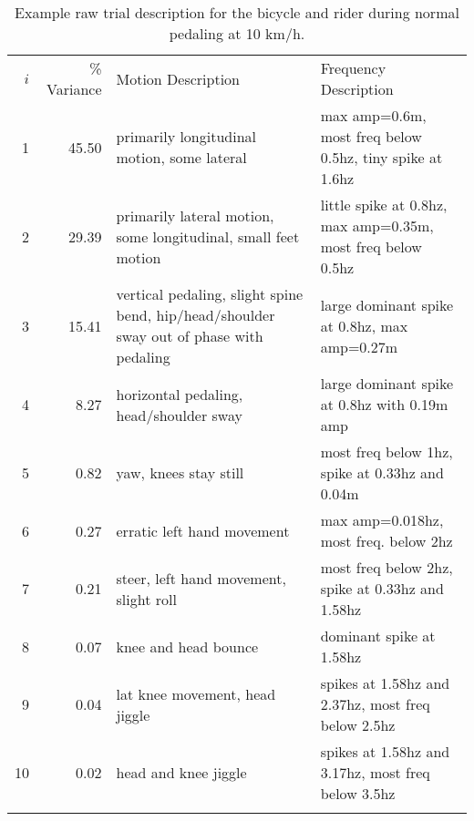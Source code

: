 \begin{table}
    \caption{Example raw trial description for the bicycle and rider during normal pedaling at 10 km/h.}
    \label{tab:trialDesc}
    \centering
    {\small
	\begin{tabular}{rrp{40mm}p{40mm}}
	\hline\noalign{\smallskip}
        $i$ & \% Variance & Motion Description & Frequency Description\\
        \noalign{\smallskip}\hline\noalign{\smallskip}
        1  & 45.50 & primarily longitudinal motion, some lateral & max amp=0.6m, most freq below 0.5hz, tiny spike at 1.6hz\\
        2  & 29.39 & primarily lateral motion, some longitudinal, small feet motion & little spike at 0.8hz, max amp=0.35m, most freq below 0.5hz\\
        3  & 15.41 & vertical pedaling, slight spine bend, hip/head/shoulder sway out of phase with pedaling & large dominant spike at 0.8hz, max amp=0.27m\\
        4  & 8.27  & horizontal pedaling, head/shoulder sway & large dominant spike at 0.8hz with 0.19m amp\\
        5  & 0.82  & yaw, knees stay still & most freq below 1hz, spike at 0.33hz and 0.04m\\
        6  & 0.27  & erratic left hand movement & max amp=0.018hz, most freq. below 2hz\\
        7  & 0.21  & steer, left hand movement, slight roll & most freq below 2hz, spike at 0.33hz and 1.58hz\\
        8  & 0.07  & knee and head bounce & dominant spike at 1.58hz\\
        9  & 0.04  & lat knee movement, head jiggle & spikes at 1.58hz and 2.37hz, most freq below 2.5hz\\
        10 & 0.02  & head and knee jiggle & spikes at 1.58hz and 3.17hz, most freq below 3.5hz\\
	\noalign{\smallskip}\hline
        \end{tabular}
    }

\end{table}

